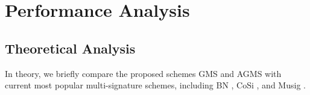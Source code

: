 \documentclass[journal]{IEEEtran}
\begin{document}
\section{Performance Analysis}
\subsection{Theoretical Analysis}
In theory, we briefly compare the proposed schemes GMS and AGMS with current most popular multi-signature schemes, including BN \cite{04DBLP:conf/ccs/BellareN06}, CoSi \cite{02DBLP:conf/sp/SytaTVWJGGKF16}, and Musig \cite{DBLP:journals/dcc/MaxwellPSW19}.
\end{document}
